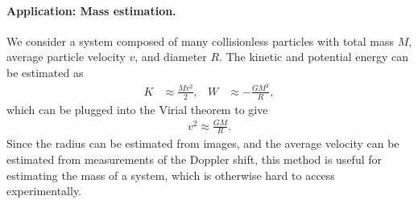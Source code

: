 

\paragraph*{Application: Mass estimation.}
We consider a system composed of many collisionless particles with total mass $M$, average particle velocity $v$, and diameter $R$.
The kinetic and potential energy can be estimated as
\begin{align*}
	K &\approx \frac{M v^2}{2},&
	W &\approx - \frac{G M^2}{R},
\end{align*}
which can be plugged into the Virial theorem to give
\begin{align*}
	v^2 \approx \frac{G M}{R}.
\end{align*}
Since the radius can be estimated from images, and the average velocity can be estimated from measurements of the Doppler shift, this method is useful for estimating the mass of a system, which is otherwise hard to access experimentally. 


